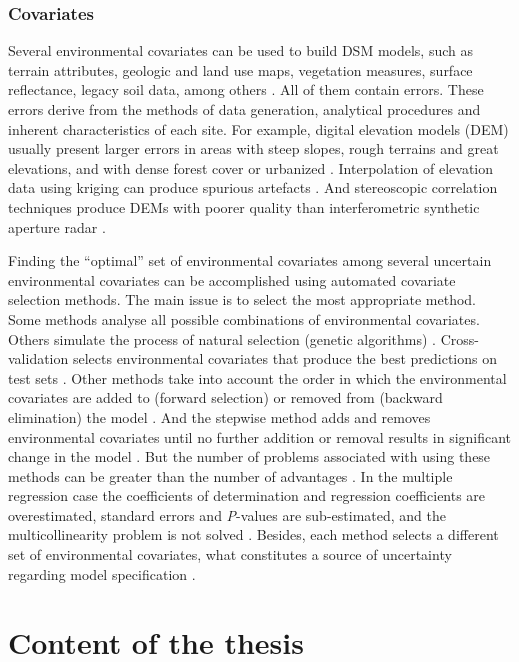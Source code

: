\subsubsection*{Covariates}

Several environmental covariates can be used to build DSM models, such as 
terrain attributes, geologic and land use maps, vegetation measures, surface 
reflectance, legacy soil data, among others \cite{McBratneyEtAl2003}. All of 
them contain errors. These errors derive from the methods of data generation, 
analytical procedures and inherent characteristics of each site. For example, 
digital elevation models (DEM) usually present larger errors in areas with steep
slopes, rough terrains and great elevations, and with dense forest cover or 
urbanized \cite{Florinsky1998, Toutin2000, FisherEtAl2006}. Interpolation of 
elevation data using kriging can produce spurious artefacts \cite{HenglEtAl2009}.
And stereoscopic correlation techniques produce DEMs with poorer quality than 
interferometric synthetic aperture radar \cite{HirtEtAl2010}.

Finding the ``optimal'' set of environmental covariates among several uncertain
environmental covariates can be accomplished using automated covariate selection
methods. The main issue is to select the most appropriate method. Some methods 
analyse all possible combinations of environmental covariates. Others simulate 
the process of natural selection (genetic algorithms) \cite{AndersenEtAl2010}. 
Cross-validation selects environmental covariates that produce the best 
predictions on test sets \cite{GuyonEtAl2003}. Other methods take into account 
the order in which the environmental covariates are added to (forward selection)
or removed from (backward elimination) the model \cite{LarkEtAl2007a}. And the 
stepwise method adds and removes environmental covariates until no further 
addition or removal results in significant change in the model 
\cite{VenablesEtAl2002}. But the number of problems associated with using these 
methods can be greater than the number of advantages \cite{Chatfield1995, 
LarkEtAl2007a}. In the multiple regression case the coefficients of 
determination and regression coefficients are overestimated, standard errors 
and \textit{P}-values are sub-estimated, and the multicollinearity problem is 
not solved \cite{Harrell2001a}. Besides, each method selects a different set of
environmental covariates, what constitutes a source of uncertainty regarding 
model specification \cite{Harrell2001a}.

\section{Content of the thesis}

